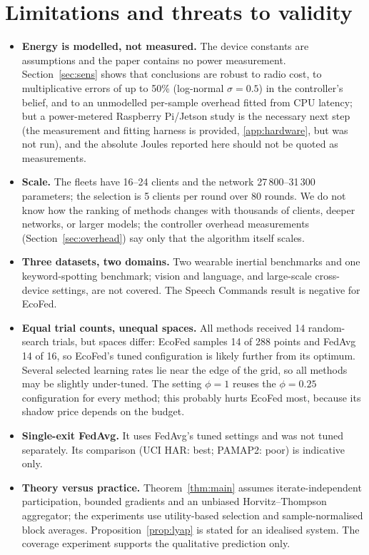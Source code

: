 \section{Limitations and threats to validity}\label{sec:limits}
\begin{itemize}[leftmargin=1.4em,itemsep=1pt]
\item \textbf{Energy is modelled, not measured.} The device constants are assumptions and the paper contains no power measurement. Section~\ref{sec:sens} shows that conclusions are robust to radio cost, to multiplicative errors of up to 50\% (log-normal $\sigma=0.5$) in the controller's belief, and to an unmodelled per-sample overhead fitted from CPU latency; but a power-metered Raspberry Pi/Jetson study is the necessary next step (the measurement and fitting harness is provided, \ref{app:hardware}, but was not run), and the absolute Joules reported here should not be quoted as measurements.
\item \textbf{Scale.} The fleets have 16--24 clients and the network 27\,800--31\,300 parameters; the selection is 5 clients per round over 80 rounds. We do not know how the ranking of methods changes with thousands of clients, deeper networks, or larger models; the controller overhead measurements (Section~\ref{sec:overhead}) say only that the algorithm itself scales.
\item \textbf{Three datasets, two domains.} Two wearable inertial benchmarks and one keyword-spotting benchmark; vision and language, and large-scale cross-device settings, are not covered. The Speech Commands result is negative for EcoFed.
\item \textbf{Equal trial counts, unequal spaces.} All methods received 14 random-search trials, but spaces differ: EcoFed samples 14 of 288 points and FedAvg 14 of 16, so EcoFed's tuned configuration is likely further from its optimum. Several selected learning rates lie near the edge of the grid, so all methods may be slightly under-tuned. The setting $\phi=1$ reuses the $\phi=0.25$ configuration for every method; this probably hurts EcoFed most, because its shadow price depends on the budget.
\item \textbf{Single-exit FedAvg.} It uses FedAvg's tuned settings and was not tuned separately. Its comparison (UCI HAR: best; PAMAP2: poor) is indicative only.
\item \textbf{Theory versus practice.} Theorem~\ref{thm:main} assumes iterate-independent participation, bounded gradients and an unbiased Horvitz--Thompson aggregator; the experiments use utility-based selection and sample-normalised block averages. Proposition~\ref{prop:lyap} is stated for an idealised system. The coverage experiment supports the qualitative prediction only.

\end{itemize}
